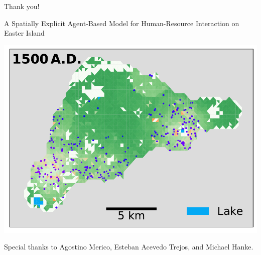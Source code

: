 \documentclass[aspectratio=1610]{beamer}
\begin{document}
\begin{frame}{Thank you!}

\vspace{0.02\textheight}

\begin{Large}
	A Spatially Explicit Agent-Based Model for Human-Resource Interaction on Easter Island
\end{Large}

\vspace{0.02\textheight}
\centering
\includegraphics[width=0.5\linewidth]{images/map_time1500}
% 
 
 \vfill 
Special thanks to Agostino Merico, Esteban Acevedo Trejos, and Michael Hanke.

\end{frame}


\appendix

\end{document}
